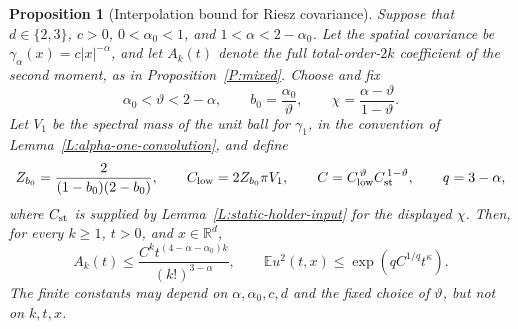 \documentclass[12pt]{article}
\numberwithin{equation}{section}
\newtheorem{proposition}[theorem]{Proposition}
\theoremstyle{definition}
\newcommand{\R}{\mathbb{R}}
\newcommand{\E}{\mathbb{E}}
\begin{document}
\begin{proposition}[Interpolation bound for Riesz covariance]
  \label{P:static-holder-upper}
  Suppose that $d \in \{2,3\}$, $c > 0$, $0 < \alpha_0 < 1$, and
  $1 < \alpha < 2-\alpha_0$. Let the spatial covariance be
  $\gamma_\alpha(x)=c|x|^{-\alpha}$, and let $A_k(t)$ denote the full
  total-order-$2k$ coefficient of the second moment, as in
  Proposition~\ref{P:mixed}. Choose and fix
  \begin{equation}\label{E:static-holder-parameters}
    \alpha_0<\vartheta<2-\alpha,\qquad
    b_0=\frac{\alpha_0}{\vartheta},\qquad
    \chi=\frac{\alpha-\vartheta}{1-\vartheta}.
  \end{equation}
  Let $V_1$ be the spectral mass of the unit ball for $\gamma_1$, in
  the convention of Lemma~\ref{L:alpha-one-convolution}, and define
  \[
    Z_{b_0}=\frac2{(1-b_0)(2-b_0)},\qquad
    C_{\rm low}=2Z_{b_0}\pi V_1,\qquad
    C=C_{\rm low}^{\,\vartheta}C_{\rm st}^{\,1-\vartheta},
    \qquad q=3-\alpha,
  \]
  where $C_{\rm st}$ is supplied by Lemma~\ref{L:static-holder-input}
  for the displayed $\chi$. Then, for every $k\ge1$, $t>0$, and
  $x\in\R^d$,
  \begin{equation}\label{E:static-holder-upper}
    A_k(t)\le\frac{C^kt^{(4-\alpha-\alpha_0)k}}{(k!)^{3-\alpha}},
    \qquad
    \E u^2(t,x)\le\exp\left(qC^{1/q}t^\kappa\right).
  \end{equation}
  The finite constants may depend on $\alpha,\alpha_0,c,d$ and the fixed
  choice of $\vartheta$, but not on $k,t,x$.
\end{proposition}
\end{document}
